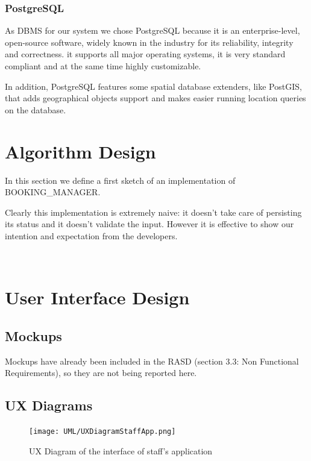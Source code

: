 \documentclass[11pt]{article} %
\begin{document}
\subsubsection{PostgreSQL}

As DBMS for our system we chose PostgreSQL because it is an enterprise-level, open-source software, widely known in the industry for its reliability, integrity and correctness. it supports all major operating systems, it is very standard compliant and at the same time highly customizable.

In addition, PostgreSQL features some spatial database extenders, like PostGIS, that adds geographical objects support and makes easier running location queries on the database.





\newpage
\section{Algorithm Design}

In this section we define a first sketch of an implementation of BOOKING\_MANAGER. 

Clearly this implementation is extremely naive: it doesn't take care of persisting its status and it doesn't validate the input. However it is effective to show our intention and expectation from the developers.

\hfil\\



\newpage
\section{User Interface Design}

\subsection{Mockups}
Mockups have already been included in the RASD (section 3.3: Non Functional Requirements), so they are not being reported here.

\subsection{UX Diagrams}

\begin{figure}[H]
	\centering
	\texttt{[image: UML/UXDiagramStaffApp.png]}
	\caption{UX Diagram of the interface of staff's application}
\end{figure}	
\end{document}
